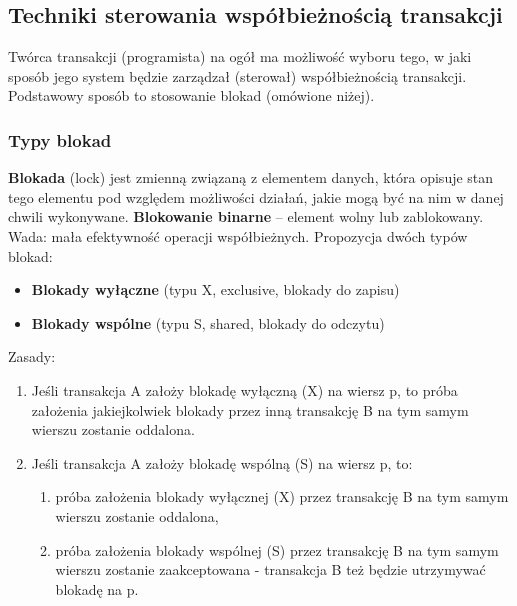 \documentclass[12pt]{article}
\begin{document}
    \subsection{Techniki sterowania współbieżnością transakcji}
    
    Twórca transakcji (programista) na ogół ma możliwość wyboru tego, w jaki sposób jego system
    będzie zarządzał (sterował) współbieżnością transakcji.
    Podstawowy sposób to stosowanie blokad (omówione niżej). 
    
    \subsubsection{Typy blokad}
    
    \textbf{Blokada} (lock) jest zmienną związaną z elementem danych, która opisuje stan tego elementu
    pod względem możliwości działań, jakie mogą być na nim w danej chwili wykonywane.
    \textbf{Blokowanie binarne} – element wolny lub zablokowany. Wada: mała efektywność operacji
    współbieżnych.
    Propozycja dwóch typów blokad:
    \begin{itemize}
        \item \textbf{Blokady wyłączne} (typu X, exclusive, blokady do zapisu)
        \item \textbf{Blokady wspólne} (typu S, shared, blokady do odczytu)
    \end{itemize}
    
    Zasady:
    \begin{enumerate}
        \item Jeśli transakcja A założy blokadę wyłączną (X) na wiersz p, to próba założenia jakiejkolwiek
        blokady przez inną transakcję B na tym samym wierszu zostanie oddalona.
        \item Jeśli transakcja A założy blokadę wspólną (S) na wiersz p, to:
        \begin{enumerate}
            \item próba założenia blokady wyłącznej (X) przez transakcję B na tym samym wierszu zostanie
            oddalona,
            \item próba założenia blokady wspólnej (S) przez transakcję B na tym samym wierszu zostanie
            zaakceptowana - transakcja B też będzie utrzymywać blokadę na p.
        \end{enumerate}
    \end{enumerate}
    
\end{document}
